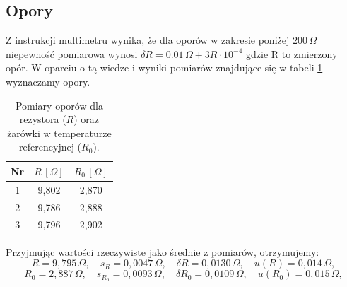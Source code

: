 \documentclass[12pt]{article}
\begin{document}
\subsection{Opory}
Z instrukcji multimetru \cite{multimeter} wynika, że dla oporów w zakresie poniżej $200\,\Omega$ niepewność pomiarowa wynosi $\delta R =0.01\,\Omega + 3R\cdot10^{-4}$ gdzie R to zmierzony opór.
W oparciu o tą wiedze i wyniki pomiarów znajdujące się w tabeli \ref{tab:opory} wyznaczamy opory.
\begin{table}[H]
    \centering
    \begin{tabular}{c|cc}
        \toprule
        \textbf{Nr} & $R \, [\Omega]$ & $R_0 \, [\Omega]$ \\
        \midrule
        1 & 9{,}802  & 2{,}870 \\
        2 & 9{,}786  & 2{,}888 \\
        3 & 9{,}796  & 2{,}902 \\
        \bottomrule
    \end{tabular}
    \caption{Pomiary oporów dla rezystora ($R$) oraz żarówki w temperaturze referencyjnej ($R_0$).}
    \label{tab:opory}
\end{table}

Przyjmując wartości rzeczywiste jako średnie z pomiarów, otrzymujemy:
\[
    R = 9{,}795\,\Omega, \quad s_{R} = 0{,}0047\,\Omega, \quad \delta R = 0{,}0130\,\Omega, \quad u(R) = 0{,}014\,\Omega,
\]
\[
    R_0 = 2{,}887\,\Omega, \quad s_{R_0} = 0{,}0093\,\Omega, \quad \delta R_0 = 0{,}0109\,\Omega, \quad u(R_0) = 0{,}015\,\Omega,
\]

\newpage
\end{document}
